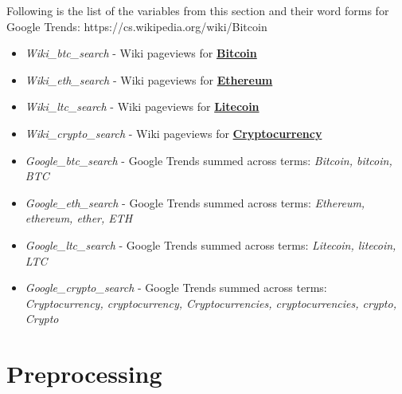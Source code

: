 Following is the list of the variables from this section and their word forms
for Google Trends:
https://cs.wikipedia.org/wiki/Bitcoin
\begin{itemize}
    \item \textit{Wiki\_btc\_search} - Wiki pageviews for \textbf{\href{https://cs.wikipedia.org/wiki/Bitcoin}{Bitcoin}}
    \item \textit{Wiki\_eth\_search} - Wiki pageviews for \textbf{\href{https://cs.wikipedia.org/wiki/Ethereum}{Ethereum}}
    \item \textit{Wiki\_ltc\_search} - Wiki pageviews for \textbf{\href{https://cs.wikipedia.org/wiki/Litecoin}{Litecoin}}
    \item \textit{Wiki\_crypto\_search} - Wiki pageviews for \textbf{\href{https://en.wikipedia.org/wiki/Cryptocurrency}{Cryptocurrency}}
    \item \textit{Google\_btc\_search} - Google Trends summed across terms: \textit{Bitcoin, bitcoin, BTC}
    \item \textit{Google\_eth\_search} - Google Trends summed across terms: \textit{Ethereum, ethereum, ether, ETH}
    \item \textit{Google\_ltc\_search} - Google Trends summed across terms: \textit{Litecoin, litecoin, LTC}
    \item \textit{Google\_crypto\_search} - Google Trends summed across terms: \textit{Cryptocurrency, cryptocurrency, Cryptocurrencies, cryptocurrencies, crypto, Crypto}
\end{itemize}


\section{Preprocessing}


